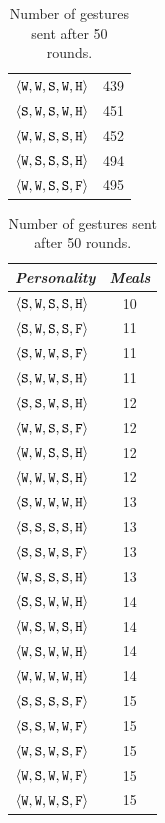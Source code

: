 \begin{table}
{{\begin{minipage}[b]{0.42\hsize}
\begin{tabular}{ l | c }
						$\personality{W}{W}{S}{W}{H}$ & 439\\
						$\personality{S}{W}{S}{W}{H}$ & 451\\
						$\personality{W}{W}{S}{S}{H}$ & 452\\
						$\personality{W}{S}{S}{S}{H}$ & 494\\
						$\personality{W}{W}{S}{S}{F}$ & 495\\
						\hline
				\end{tabular}
				\caption{Number of gestures sent after 50 rounds.}
				\label{tab:numGestures}
			\end{minipage}
			\hfill
			\begin{minipage}[b]{0.42\hsize}\centering
				\begin{tabular}{ l | c }
					\emph{Personality} & \emph{Meals} \\
					\hline
						$\personality{S}{W}{S}{S}{H}$ & 10\\
						$\personality{S}{W}{S}{S}{F}$ & 11\\
						$\personality{S}{W}{W}{S}{F}$ & 11\\
						$\personality{S}{W}{W}{S}{H}$ & 11\\
						$\personality{S}{S}{W}{S}{H}$ & 12\\
						$\personality{W}{W}{S}{S}{F}$ & 12\\
						$\personality{W}{W}{S}{S}{H}$ & 12\\
						$\personality{W}{W}{W}{S}{H}$ & 12\\
						$\personality{S}{W}{W}{W}{H}$ & 13\\
						$\personality{S}{S}{S}{S}{H}$ & 13\\
						$\personality{S}{S}{W}{S}{F}$ & 13\\
						$\personality{W}{S}{S}{S}{H}$ & 13\\
						$\personality{S}{S}{W}{W}{H}$ & 14\\
						$\personality{W}{S}{W}{S}{H}$ & 14\\
						$\personality{W}{S}{W}{W}{H}$ & 14\\
						$\personality{W}{W}{W}{W}{H}$ & 14\\
						$\personality{S}{S}{S}{S}{F}$ & 15\\
						$\personality{S}{S}{W}{W}{F}$ & 15\\
						$\personality{W}{S}{W}{S}{F}$ & 15\\
						$\personality{W}{S}{W}{W}{F}$ & 15\\
						$\personality{W}{W}{W}{S}{F}$ & 15\\

\end{tabular}
\end{minipage}}}
\end{table}

